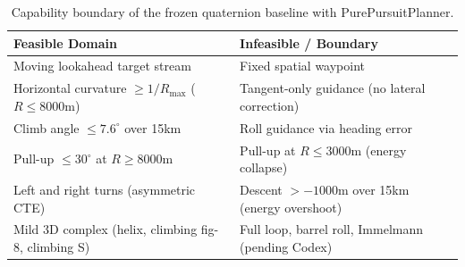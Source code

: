 \begin{table}[t]
\centering
\caption{Capability boundary of the frozen quaternion baseline with PurePursuitPlanner.}
\label{tab:capability_boundary}
\small
\begin{tabular}{p{}p{}}
\toprule
\textbf{Feasible Domain} & \textbf{Infeasible / Boundary} \\
\midrule
Moving lookahead target stream & Fixed spatial waypoint \\
Horizontal curvature $\geq 1/R_{\max}$ ($R\leq 8000$m) & Tangent-only guidance (no lateral correction) \\
Climb angle $\leq 7.6^\circ$ over 15km & Roll guidance via heading error \\
Pull-up $\leq 30^\circ$ at $R\geq 8000$m & Pull-up at $R\leq 3000$m (energy collapse) \\
Left and right turns (asymmetric CTE) & Descent $> -1000$m over 15km (energy overshoot) \\
Mild 3D complex (helix, climbing fig-8, climbing S) & Full loop, barrel roll, Immelmann (pending Codex) \\
\bottomrule
\end{tabular}
\end{table}
